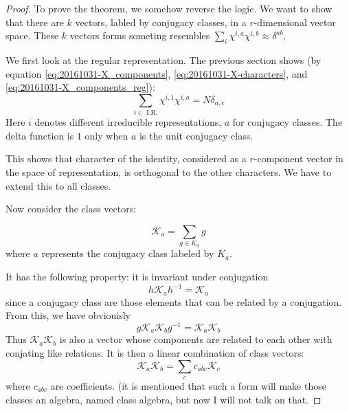     \begin{proof}
        To prove the theorem, we somehow reverse the logic. We want to
        show that there are $k$ vectors, labled by conjugacy classes,
        in a $r$-dimensional vector space. These $k$ vectors forms
        someting resembles 
        $\sum_i \chi^{i,a}\chi^{i,b}\approx \delta^{ab}$.
        
        We first look at the regular representation. The previous
        section shows (by equation \ref{eq:20161031-X_components},
        \ref{eq:20161031-X-characters}, and
        \ref{eq:20161031-X_components_reg}):
        \begin{equation}
            \sum_{i\in\text{ I.R.}} \chi^{i,1}\chi^{i,a} = N
            \delta_{a,e}
            \label{eq:20161031-x1xa-Ndelta}
        \end{equation}
        Here $i$ denotes different irreducible representations, $a$
        for conjugacy classes. The delta function is $1$ only when $a$
        is the unit conjugacy class.
         
        This shows that character of the identity, considered as a
        $r$-component vector in the space of representation, is
        orthogonal to the other characters. We have to extend this to
        all classes.
        
        Now consider the class vectors:
        \begin{defi}
            \begin{equation}
                \mathcal{K}_a = \sum_{g\in K_a} g
            \end{equation}
            where $a$ represents the conjugacy class labeled
            by $K_a$.
        \end{defi}
        It has the following property: it is invariant under
        conjugation
        \begin{equation}
            h\mathcal{K}_a h^{-1} = \mathcal{K}_a
            \label{eq:20161031-hKh-K}
        \end{equation}
        since a conjugacy class are those elements that can be related by a
        conjugation. From this, we have obviouisly
        \begin{equation}
            g\mathcal{K}_a \mathcal{K}_b g^{-1} = \mathcal{K}_a
            \mathcal{K}_b
        \end{equation}
        Thus $\mathcal{K}_a \mathcal{K}_b$ is also a vector whose
        components are related to
        each other with conjating like relations. It is then a linear
        combination of class vectors:
        \begin{equation}
            \label{eq:20161031-algebra-like-relation}
            \mathcal{K}_a\mathcal{K}_b = \sum_c c_{abc} \mathcal{K}_c
        \end{equation}
        where $c_{abc}$ are coefficients.
        (it is mentioned that such a form will make those classes an
        algebra, named class algebra, but now I will not talk on that.


\end{proof}
